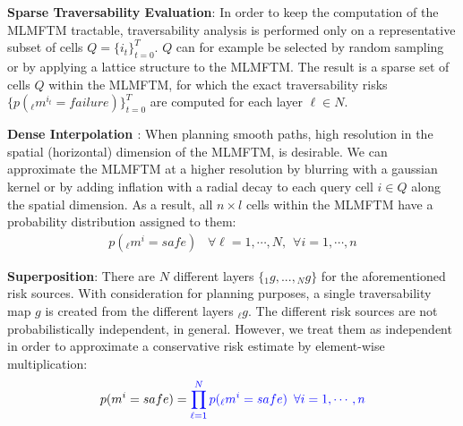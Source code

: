 \documentclass[letterpaper, 10pt, conference]{ieeeconf}      %
\newcommand{\ph}[1]{{\textbf{#1}:}} %
\newcommand{\rev}[1]{{\color{blue} #1 }} %
\begin{document}
\ph{Sparse Traversability Evaluation}
\rev{In order to keep the computation of the MLMFTM tractable, traversability analysis is performed only on a representative subset of cells $Q = \{i_t\}_{t=0}^T$.
$Q$ can for example be selected by random sampling or by applying a lattice structure to the MLMFTM.
The result is a sparse set of cells $Q$ within the MLMFTM, for which the exact traversability risks $\{p({}_{\ell}m^{i_t}=failure)\}_{t=0}^T$ are computed for each layer $\ell \in N$.}

\ph{Dense \rev{Interpolation}}
When planning smooth paths, high resolution
in the \rev{spatial (horizontal)}dimension of the \rev{MLMFTM,}is desirable.
We can approximate the \rev{MLMFTM}at a higher resolution by \rev{blurring with a gaussian kernel or by adding inflation with a radial decay to each query cell $i \in Q$ along the \rev{spatial}dimension.
As a result, all $n \times l$ cells within the MLMFTM have a probability distribution assigned to them:
\begin{align}
    p({}_{\ell}m^{i}=safe) \hspace{10pt} \forall {\ell}=1,\cdots,N, \hspace{5pt} \forall i = 1,\cdots,n 
\end{align}}

\ph{Superposition}
There are \rev{$N$}different \rev{layers} $\{{}_{1}g,...,{}_{N}g\}$ for the aforementioned risk sources.
With consideration for planning purposes,
a single traversability map $g$ is created from the different layers ${}_{\ell}g$.
The different risk sources are not probabilistically independent, \rev{in general.} 
\rev{However, we treat them as independent in order to approximate a conservative risk estimate by element-wise multiplication:}
\begin{align}
p(m^i=safe) = \rev{\prod_{\ell=1}^Np({}_{\ell}m^{i}=safe)\hspace{5pt} \forall i = 1,\cdots,n}
\end{align}
\end{document}
